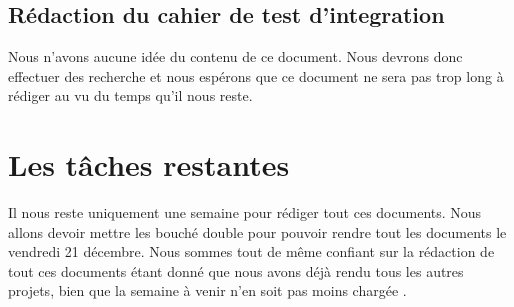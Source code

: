 \documentclass[a4paper]{article}
\begin{document}
\subsection{Rédaction du cahier de test d'integration}
Nous n'avons aucune idée du contenu de ce document. Nous devrons donc effectuer des recherche et nous espérons que ce document ne sera pas trop long à rédiger au vu du temps qu'il nous reste.

\section{Les tâches restantes}
Il nous reste uniquement une semaine pour rédiger tout ces documents. Nous allons devoir mettre les bouché double pour pouvoir rendre tout les documents le vendredi 21 décembre. Nous sommes tout de même confiant sur la rédaction de tout ces documents étant donné que nous avons déjà rendu tous les autres projets, bien que la semaine à venir n'en soit pas moins chargée .
\end{document}
